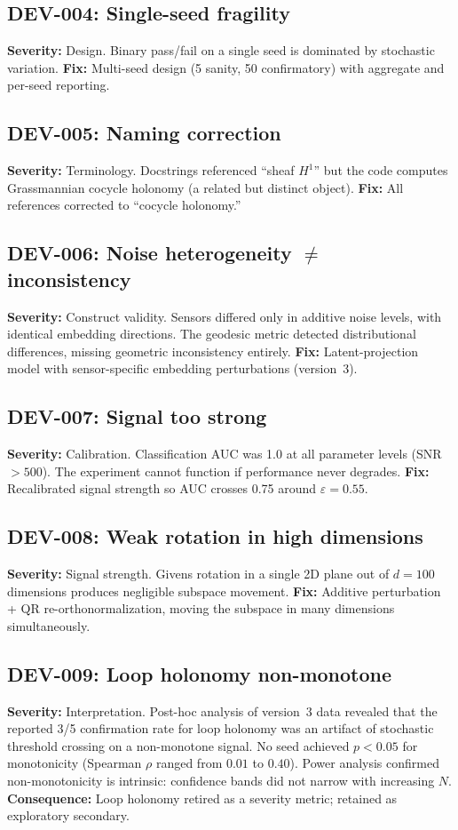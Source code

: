 \documentclass[11pt]{article}
\newcommand{\eps}{\varepsilon}
\begin{document}
\subsection*{DEV-004: Single-seed fragility}
\textbf{Severity:} Design.
Binary pass/fail on a single seed is dominated by stochastic
variation.
\textbf{Fix:} Multi-seed design (5 sanity, 50 confirmatory) with
aggregate and per-seed reporting.

\subsection*{DEV-005: Naming correction}
\textbf{Severity:} Terminology.
Docstrings referenced ``sheaf $H^1$'' but the code computes
Grassmannian cocycle holonomy (a related but distinct object).
\textbf{Fix:} All references corrected to ``cocycle holonomy.''

\subsection*{DEV-006: Noise heterogeneity $\neq$ inconsistency}
\textbf{Severity:} Construct validity.
Sensors differed only in additive noise levels, with identical
embedding directions.
The geodesic metric detected distributional differences,
missing geometric inconsistency entirely.
\textbf{Fix:} Latent-projection model with sensor-specific
embedding perturbations (version~3).

\subsection*{DEV-007: Signal too strong}
\textbf{Severity:} Calibration.
Classification AUC was 1.0 at all parameter levels (SNR $> 500$).
The experiment cannot function if performance never degrades.
\textbf{Fix:} Recalibrated signal strength so AUC crosses 0.75
around $\eps = 0.55$.

\subsection*{DEV-008: Weak rotation in high dimensions}
\textbf{Severity:} Signal strength.
Givens rotation in a single 2D plane out of $d = 100$ dimensions
produces negligible subspace movement.
\textbf{Fix:} Additive perturbation + QR re-orthonormalization,
moving the subspace in many dimensions simultaneously.

\subsection*{DEV-009: Loop holonomy non-monotone}
\textbf{Severity:} Interpretation.
Post-hoc analysis of version~3 data revealed that the reported
3/5 confirmation rate for loop holonomy was an artifact of
stochastic threshold crossing on a non-monotone signal.  No seed
achieved $p < 0.05$ for monotonicity (Spearman $\rho$ ranged from
$0.01$ to $0.40$).  Power analysis confirmed non-monotonicity is
intrinsic: confidence bands did not narrow with increasing $N$.
\textbf{Consequence:} Loop holonomy retired as a severity metric;
retained as exploratory secondary.
\end{document}
